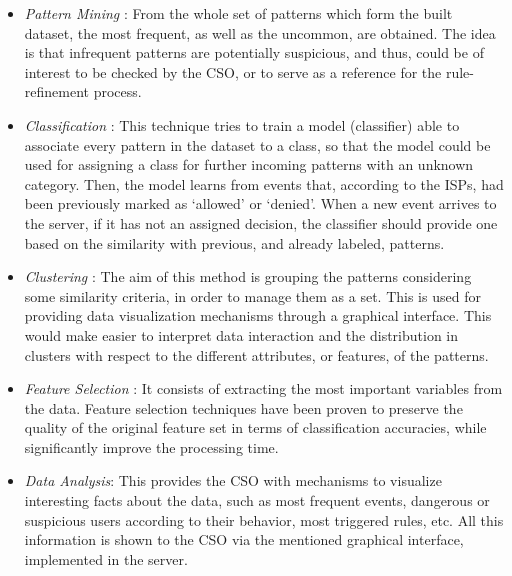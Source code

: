 \begin{itemize}

\item \textit{Pattern Mining} \cite{PatternMining_Han07}: 
From the whole set of patterns which form the built dataset, the most frequent, as well as the uncommon, are obtained. The idea is that infrequent patterns are potentially suspicious, and thus, could be of interest to be checked by the CSO, or to serve as a reference for the rule-refinement process.

\item \textit{Classification} \cite{classification_67}: 
This technique tries to train a model (classifier) able to associate every pattern in the dataset to a class, so that the model could be used for assigning a class for further incoming patterns with an unknown category.
Then, the model learns from events that, according to the ISPs, had been previously marked as `allowed' or `denied'. When a new event arrives to the server, if it has not an assigned decision, the classifier should provide one based on the similarity with previous, and already labeled, patterns.

\item \textit{Clustering} \cite{Clustering_Jain99}: 
The aim of this method is grouping the patterns considering some similarity criteria, in order to manage them as a set. This is used for providing data visualization mechanisms through a graphical interface. This would make easier to interpret data interaction and the distribution in clusters with respect to the different attributes, or features, of the patterns.

\item \textit{Feature Selection} \cite{FeatureSelection_Guyon03}: 
It consists of extracting the most important variables from the data. Feature selection techniques have been proven \cite{liu1998feature} to preserve the quality of the original feature set in terms of classification accuracies, while significantly improve the processing time.

\item \textit{Data Analysis}: 
This provides the CSO with mechanisms to visualize interesting facts about the data, such as most frequent events, dangerous or suspicious users according to their behavior, most triggered rules, etc. All this information is shown to the CSO via the mentioned graphical interface, implemented in the server.

\end{itemize}

